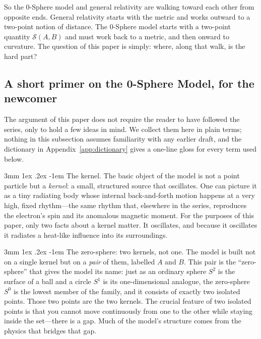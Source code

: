 \documentclass[%
 reprint, amsmath,amssymb, aps, prb, ]{revtex4-2}
\makeatletter
\numberwithin{equation}{section}
\renewcommand\paragraph{%
  \@startsection{paragraph}{4}{\z@}%
    {3mm \@plus 1ex \@minus .2ex}%
    {-1em}%
    {\normalfont\normalsize\itshape}}
\makeatother
\begin{document}
So the 0-Sphere model and general relativity are walking toward each other from opposite ends. General relativity starts with the metric and works outward to a two-point notion of distance. The 0-Sphere model starts with a two-point quantity $\mathcal{S}(A,B)$ and must work back to a metric, and then onward to curvature. The question of this paper is simply: where, along that walk, is the hard part?

\subsection{A short primer on the 0-Sphere Model, for the newcomer}
\label{subsec:primer}

The argument of this paper does not require the reader to have followed the series, only to hold a few ideas in mind. We collect them here in plain terms; nothing in this subsection assumes familiarity with any earlier draft, and the dictionary in Appendix~\ref{app:dictionary} gives a one-line gloss for every term used below.

\paragraph{The kernel.}
The basic object of the model is not a point particle but a \emph{kernel}: a small, structured source that oscillates. One can picture it as a tiny radiating body whose internal back-and-forth motion happens at a very high, fixed rhythm---the same rhythm that, elsewhere in the series, reproduces the electron's spin and its anomalous magnetic moment. For the purposes of this paper, only two facts about a kernel matter. It oscillates, and because it oscillates it radiates a heat-like influence into its surroundings.

\paragraph{The zero-sphere: two kernels, not one.}
The model is built not on a single kernel but on a \emph{pair} of them, labelled $A$ and $B$. This pair is the ``zero-sphere'' that gives the model its name: just as an ordinary sphere $S^2$ is the surface of a ball and a circle $S^1$ is its one-dimensional analogue, the zero-sphere $S^0$ is the lowest member of the family, and it consists of exactly two isolated points. Those two points are the two kernels. The crucial feature of two isolated points is that you cannot move continuously from one to the other while staying inside the set---there is a gap. Much of the model's structure comes from the physics that bridges that gap.
\end{document}
